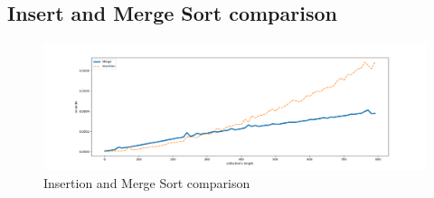 \subsection{Insert and Merge Sort comparison}

\begin{figure}[p]
    \includegraphics[angle=90,scale=0.45]{sections/6attach/figures/insertion_vs_merge_sort.png}
    \caption{Insertion and Merge Sort comparison}
    \centering
\end{figure}
